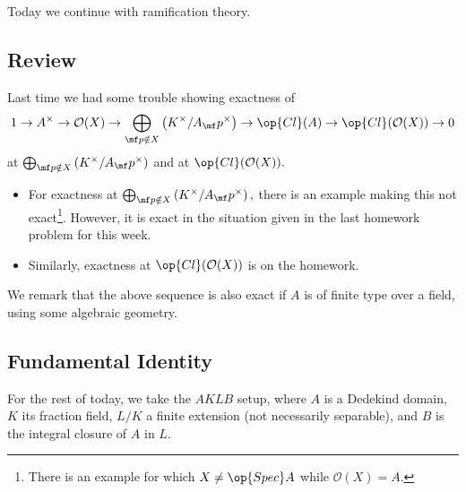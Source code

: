 \documentclass[../notes.tex]{subfiles}
\begin{document}














Today we continue with ramification theory.

\subsection{Review}
Last time we had some trouble showing exactness of
\[1\to A^\times\to\mathcal O(X)\to\bigoplus_{\mf p\notin X}\left(K^\times/A_\mf p^\times\right)\to\op{Cl}(A)\to\op{Cl}(\mathcal O(X))\to0\]
at $\bigoplus_{\mf p\notin X}\left(K^\times/A_\mf p^\times\right)$ and at $\op{Cl}(\mathcal O(X)).$
\begin{itemize}
	\item For exactness at $\bigoplus_{\mf p\notin X}\left(K^\times/A_\mf p^\times\right),$ there is an example making this not exact\footnote{There is an example for which $X\ne\op{Spec}A$ while $\mathcal O(X)=A.$}. However, it is exact in the situation given in the last homework problem for this week.
	\item Similarly, exactness at $\op{Cl}(\mathcal O(X))$ is on the homework.
\end{itemize}
We remark that the above sequence is also exact if $A$ is of finite type over a field, using some algebraic geometry.

\subsection{Fundamental Identity}
For the rest of today, we take the $AKLB$ setup, where $A$ is a Dedekind domain, $K$ its fraction field, $L/K$ a finite extension (not necessarily separable), and $B$ is the integral closure of $A$ in $L.$
\end{document}
